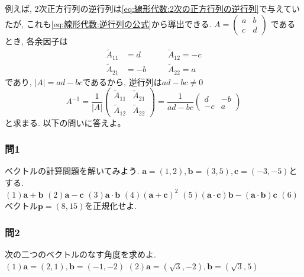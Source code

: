         例えば, 2次正方行列の逆行列は\eqref{eq:線形代数:2次の正方行列の逆行列}で与えていたが, これも\eqref{eq:線形代数:逆行列の公式}から導出できる. $A=\begin{pmatrix}a & b \\ c & d\end{pmatrix}$
        であるとき, 各余因子は
        \begin{align*}
            \tilde{A}_{11} &= d \quad &&\tilde{A}_{12} = -c\\
            \tilde{A}_{21} &= -b\quad &&\tilde{A}_{22} =a 
        \end{align*}
        であり, $|A|=ad-bc$であるから, 逆行列は$ad-bc\neq 0$
        \begin{equation*}
            A^{-1}
            =\frac{1}{|A|}\begin{pmatrix}
                \tilde{A}_{11} & \tilde{A}_{21}\\
                \tilde{A}_{12} & \tilde{A}_{22}
            \end{pmatrix}
            =\frac{1}{ad-bc}\begin{pmatrix}
                d & -b \\ -c & a
            \end{pmatrix}
        \end{equation*}
        と求まる.
\clearpage
\basicquestion 以下の問いに答えよ。

    \subsubsection*{問1} ベクトルの計算問題を解いてみよう. $\bm{a}=(1,2),\bm{b}=(3,5),\bm{c}=(-3,-5)$とする.\\
        $(1)\bm{a}+\bm{b}$\hspace{1mm}
        $(2)\bm{a}-\bm{c}$\hspace{1mm}
        $(3)\bm{a}\cdot\bm{b}$\hspace{1mm}
        $(4)(\bm{a}+\bm{c})^2$\hspace{1mm}
        $(5)(\bm{a}\cdot\bm{c})\bm{b}-(\bm{a}\cdot\bm{b})\bm{c}$\hspace{1mm}
        $(6)$ベクトル$\bm{p}=(8,15)$を正規化せよ.

    \subsubsection*{問2} 次の二つのベクトルのなす角度を求めよ.\\
        $(1)\bm{a}=(2,1),\bm{b}=(-1,-2)$\hspace{1mm}
        $(2)\bm{a}=(\sqrt{3},-2),\bm{b}=(\sqrt{3},5)$

